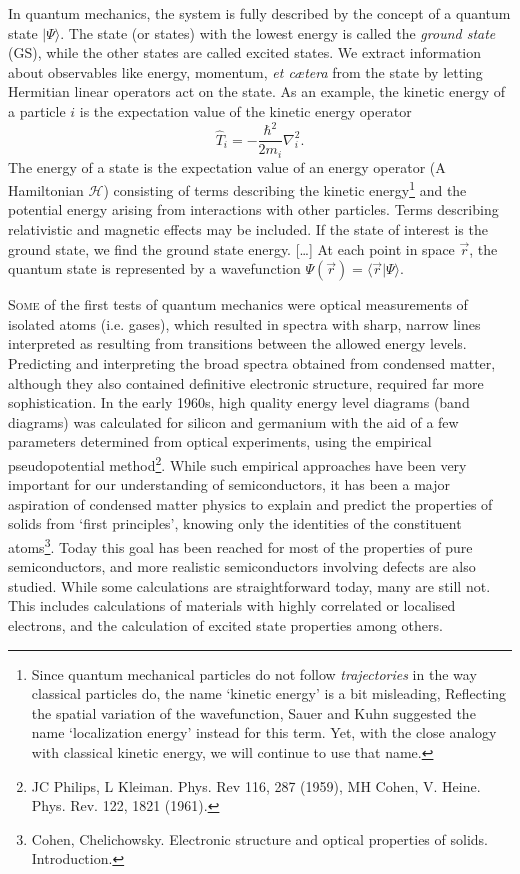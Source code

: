 \documentclass[11pt,bibliography=totoc,index=totoc]{scrbook}   %
\begin{document}
In quantum mechanics, the system is fully
described by the concept of a quantum state $|\Psi\rangle$. The state (or
states) with the lowest energy is called the \emph{ground state} (GS), 
while the other states are called excited states. We extract information about 
observables like energy, momentum, \textit{et cætera} from the state by 
letting Hermitian linear operators act on the state. As an example, the 
kinetic energy of a particle $i$ is the expectation value of the kinetic 
energy operator
\begin{equation}
  \hat{T}_i = -\frac{\hbar^2}{2m_i}\nabla_i^2.
  \label{eq:kineticenergy}
\end{equation}
The energy of a state is the expectation value of an energy operator (A
Hamiltonian $\mathcal{H}$) consisting of terms describing the kinetic 
energy\footnote{Since quantum mechanical particles do not follow \emph{trajectories} 
in the way classical particles do, the name `kinetic energy' is 
a bit misleading, Reflecting the spatial variation of the wavefunction, Sauer and Kuhn suggested the 
name `localization energy' instead for this term\cite{Sauer:1982}.
Yet, with the close analogy with classical kinetic energy, we will continue to use that name.
}
and the potential energy arising from interactions with other particles.
Terms describing relativistic and magnetic effects may be included.
If the state of interest is the ground state, we find the ground state energy.
[\dots] At each point in space $\vec{r}$, the quantum state is represented by a 
wavefunction $\Psi(\vec{r})=\langle\vec{r}|\Psi\rangle$.



\lettrine[lines=3,slope=0pt,nindent=0pt]{S}{ome}
of the first tests of quantum mechanics were optical measurements of
isolated atoms (i.e. gases), which resulted in spectra with sharp, narrow 
lines interpreted as resulting from transitions between the allowed energy 
levels. Predicting and interpreting the broad spectra obtained from condensed 
matter, although they also contained definitive electronic structure, required 
far more sophistication. In the early 1960s, high quality energy level diagrams 
(band diagrams) was calculated for silicon and germanium with the aid of a few
parameters determined from optical experiments, using the empirical
pseudopotential method\footnote{JC Philips, L Kleiman. Phys. Rev 116, 287
(1959), MH Cohen, V. Heine. Phys. Rev. 122, 1821 (1961).}. While such
empirical approaches have been very important for our understanding of
semiconductors, it has been a major aspiration of condensed matter
physics to explain and predict the properties of solids from `first
principles', knowing only the identities of the constituent
atoms\footnote{Cohen, Chelichowsky. Electronic structure and optical
properties of solids. Introduction.}. Today this goal has been reached for
most of the properties of pure semiconductors, and more realistic
semiconductors involving defects are also studied. While some calculations
are straightforward today, many are still not. This includes calculations of
materials with highly correlated or localised electrons, and the calculation
of excited state properties among others.
\end{document}
